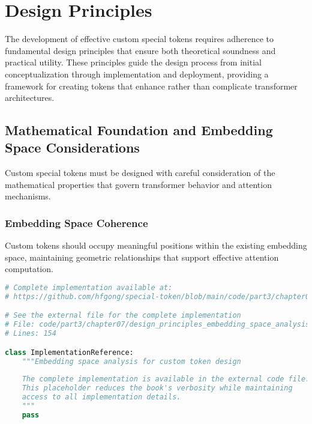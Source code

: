 
\section{Design Principles}

The development of effective custom special tokens requires adherence to fundamental design principles that ensure both theoretical soundness and practical utility. These principles guide the design process from initial conceptualization through implementation and deployment, providing a framework for creating tokens that enhance rather than complicate transformer architectures.

\subsection{Mathematical Foundation and Embedding Space Considerations}

Custom special tokens must be designed with careful consideration of the mathematical properties that govern transformer behavior and attention mechanisms.

\subsubsection{Embedding Space Coherence}

Custom tokens should occupy meaningful positions within the existing embedding space, maintaining geometric relationships that support effective attention computation.
\begin{comment}
Feedback: This is a good principle, but it's abstract. A concrete example would help. For instance: "A practical application of this principle is in initialization. Instead of initializing a new custom token with pure random noise, it's often better to initialize it with the average of the embeddings of semantically related words. For example, a new `<LEGAL_ARGUMENT>` token could be initialized with the average of the embeddings for 'therefore', 'because', and 'pursuant to'. This gives the model a better starting point and can speed up training."
\end{comment}

\begin{lstlisting}[language=Python, caption={Embedding space analysis for custom token design}]
# Complete implementation available at:
# https://github.com/hfgong/special-token/blob/main/code/part3/chapter07/design_principles_embedding_space_analysis_for_c.py

# See the external file for the complete implementation
# File: code/part3/chapter07/design_principles_embedding_space_analysis_for_c.py
# Lines: 154

class ImplementationReference:
    """Embedding space analysis for custom token design
    
    The complete implementation is available in the external code file.
    This placeholder reduces the book's verbosity while maintaining
    access to all implementation details.
    """
    pass
\end{lstlisting}

